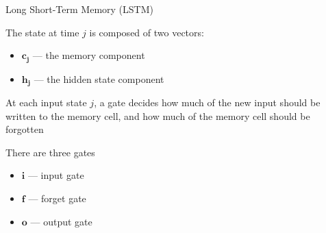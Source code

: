 \documentclass[12pt,aspectratio=169,handout]{beamer}
\begin{document}
\begin{frame}{Long Short-Term Memory (LSTM)}

The state at time $j$ is composed of two vectors:
\begin{itemize}
	\item $\bm{c_j}$ --- the memory component
	\item $\bm{h_j}$ --- the hidden state component
\end{itemize}

\pause
At each input state $j$, a gate decides how much of the new input should be written to the memory cell, and how much of the memory cell should be forgotten

\pause
There are three gates
\begin{itemize}
	\item $\bm{i}$ --- input gate
	\item $\bm{f}$ --- forget gate
	\item $\bm{o}$ --- output gate
\end{itemize}


\end{frame}
\end{document}

